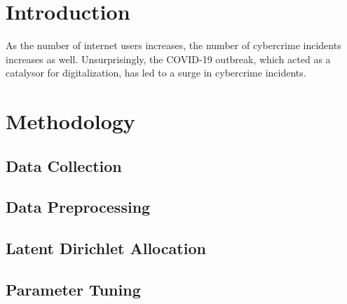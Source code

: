 \documentclass[12pt,english,titlepage,a4paper]{article}
\begin{document}

\tableofcontents
\pagebreak


\section{Introduction}

As the number of internet users increases, the number of cybercrime incidents increases as well. Unsurprisingly, the COVID-19 outbreak, which acted as a catalysor for digitalization, has led to a surge in cybercrime incidents.  


\pagebreak


\section{Methodology}

\subsection{Data Collection}

\subsection{Data Preprocessing}

\subsection{Latent Dirichlet Allocation}

\subsection{Parameter Tuning}



\pagebreak
\begin{thebibliography}{ccccc}
\end{thebibliography}
\end{document}
